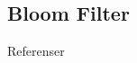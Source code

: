 \documentclass{beamer}
\begin{document}
%
%
%
%
%
%
%

\subsection{Bloom Filter}

\begin{frame}{\insertsubsectionhead}
\end{frame}




\begin{frame}[allowframebreaks]{Referenser}
	\small
  \printbibliography
\end{frame}
\end{document}
